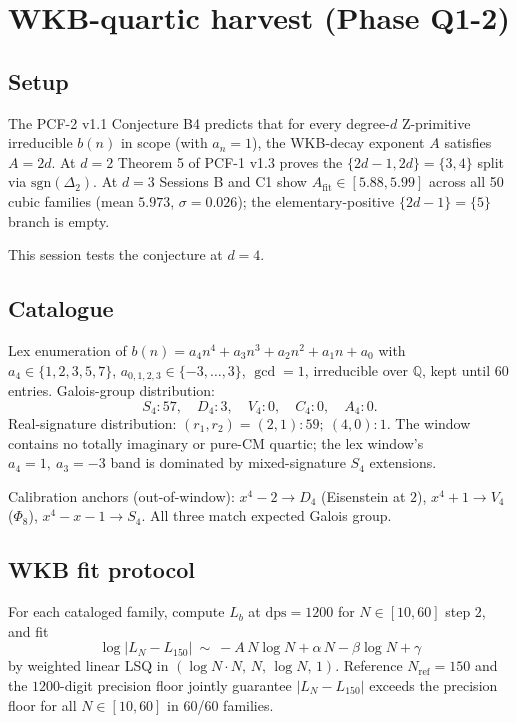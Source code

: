 \section*{WKB-quartic harvest (Phase Q1-2)}

\subsection*{Setup}

The PCF-2 v1.1 Conjecture B4 predicts that for every degree-$d$ Z-primitive
irreducible $b(n)$ in scope (with $a_n=1$), the WKB-decay exponent
$A$ satisfies $A=2d$. At $d=2$ Theorem 5 of PCF-1 v1.3 proves the
$\{2d-1,2d\}=\{3,4\}$ split via $\mathrm{sgn}(\Delta_2)$. At $d=3$ Sessions
B and C1 show $A_{\mathrm{fit}}\in[5.88,5.99]$ across all 50 cubic
families (mean $5.973$, $\sigma=0.026$); the elementary-positive
$\{2d-1\}=\{5\}$ branch is empty.

This session tests the conjecture at $d=4$.

\subsection*{Catalogue}

Lex enumeration of $b(n)=a_4 n^4+a_3 n^3+a_2 n^2+a_1 n+a_0$ with
$a_4\in\{1,2,3,5,7\}$, $a_{0,1,2,3}\in\{-3,\ldots,3\}$, $\gcd=1$,
irreducible over $\mathbb{Q}$, kept until 60 entries. Galois-group
distribution:
\[
S_4 : 57,\quad D_4 : 3,\quad V_4 : 0,\quad C_4 : 0,\quad A_4 : 0.
\]
Real-signature distribution:
$(r_1,r_2)=(2,1):59;\ (4,0):1$. The window contains no totally
imaginary or pure-CM quartic; the lex window's $a_4=1,\ a_3=-3$ band
is dominated by mixed-signature $S_4$ extensions.

Calibration anchors (out-of-window): $x^4-2\to D_4$ (Eisenstein at
$2$), $x^4+1\to V_4$ ($\Phi_8$), $x^4-x-1\to S_4$. All three match
expected Galois group.

\subsection*{WKB fit protocol}

For each cataloged family, compute $L_b$ at $\mathrm{dps}=1200$ for
$N\in[10,60]$ step $2$, and fit
\[
\log|L_N - L_{150}|\ \sim\ -A\,N\log N + \alpha\,N - \beta\log N + \gamma
\]
by weighted linear LSQ in $(\log N\cdot N,\,N,\,\log N,\,1)$. Reference
$N_{\mathrm{ref}}=150$ and the $1200$-digit precision floor jointly
guarantee $|L_N - L_{150}|$ exceeds the precision floor for all
$N\in[10,60]$ in 60/60 families.

